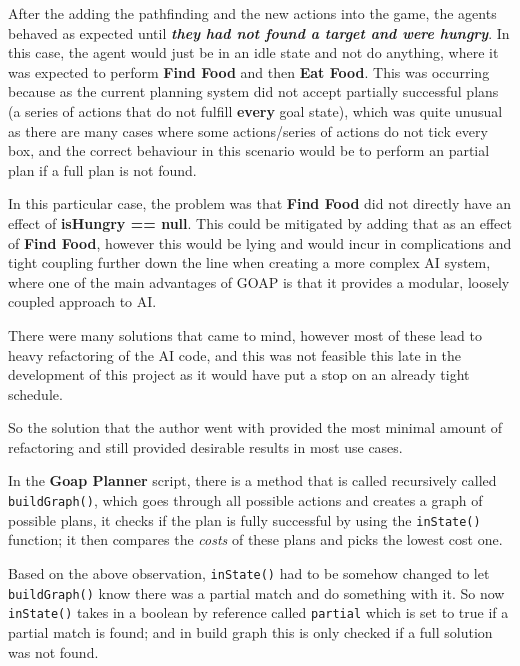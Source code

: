 \documentclass[12pt]{report}
\begin{document}
After the adding the pathfinding and the new actions into the game, the agents behaved as expected until \textit{\textbf{they had not found a target and were hungry}}. In this case, the agent would just be in an idle state and not do anything, where it was expected to perform \textbf{Find Food} and then \textbf{Eat Food}. This was occurring because as the current planning system did not accept partially successful plans (a series of actions that do not fulfill \textbf{every} goal state), which was quite unusual as there are many cases where some actions/series of actions do not tick every box, and the correct behaviour in this scenario would be to perform an partial plan if a full plan is not found.

In this particular case, the problem was that \textbf{Find Food} did not directly have an effect of \textbf{isHungry == null}. This could be mitigated by adding that as an effect of \textbf{Find Food}, however this would be lying and would incur in complications and tight coupling further down the line when creating a more complex AI system, where one of the main advantages of GOAP is that it provides a modular, loosely coupled approach to AI.

There were many solutions that came to mind, however most of these lead to heavy refactoring of the AI code, and this was not feasible this late in the development of this project as it would have put a stop on an already tight schedule.

So the solution that the author went with provided the most minimal amount of refactoring and still provided desirable results in most use cases.

In the \textbf{Goap Planner} script, there is a method that is called recursively called \lstinline{buildGraph()}, which goes through all possible actions and creates a graph of possible plans, it checks if the plan is fully successful by using the \lstinline{inState()} function; it then compares the \textit{costs} of these plans and picks the lowest cost one.

Based on the above observation, \lstinline{inState()}  had to be somehow changed to let \lstinline{buildGraph()} know there was a partial match and do something with it. So now \lstinline{inState()} takes in a boolean by reference called \lstinline{partial} which is set to true if a partial match is found; and in build graph this is only checked if a full solution was not found.
\end{document}
